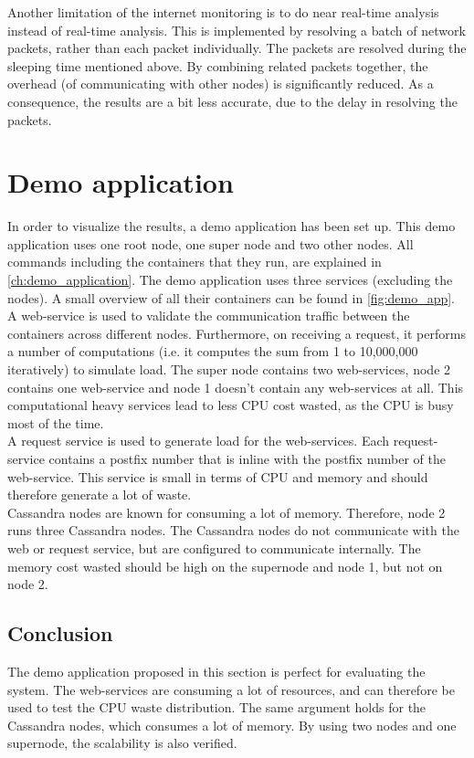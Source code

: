 \noindent
Another limitation of the internet monitoring is to do near real-time analysis instead of real-time analysis. This is implemented by resolving a batch of network packets, rather than each packet individually. The packets are resolved during the sleeping time mentioned above. By combining related packets together, the overhead (of communicating with other nodes) is significantly reduced. As a consequence, the results are a bit less accurate, due to the delay in resolving the packets.


\section{Demo application} \label{sec:demo_app}
In order to visualize the results, a demo application has been set up. This demo application uses one root node, one super node and two other nodes. All commands including the containers that they run, are explained in \autoref{ch:demo_application}. The demo application uses three services (excluding the nodes). A small overview of all their containers can be found in \autoref{fig:demo_app}.\\

\noindent
A web-service is used to validate the communication traffic between the containers across different nodes. Furthermore, on receiving a request, it performs a number of computations (i.e. it computes the sum from 1 to 10,000,000 iteratively) to simulate load. The super node contains two web-services, node 2 contains one web-service and node 1 doesn't contain any web-services at all. This computational heavy services lead to less CPU cost wasted, as the CPU is busy most of the time.\\

\noindent
A request service is used to generate load for the web-services. Each request-service contains a postfix number that is inline with the postfix number of the web-service. This service is small in terms of CPU and memory and should therefore generate a lot of waste.\\

\noindent
Cassandra nodes are known for consuming a lot of memory. Therefore, node 2 runs three Cassandra nodes. The Cassandra nodes do not communicate with the web or request service, but are configured to communicate internally. The memory cost wasted should be high on the supernode and node 1, but not on node 2.

\subsection{Conclusion}
The demo application proposed in this section is perfect for evaluating the system. The web-services are consuming a lot of resources, and can therefore be used to test the CPU waste distribution. The same argument holds for the Cassandra nodes, which consumes a lot of memory. By using two nodes and one supernode, the scalability is also verified.